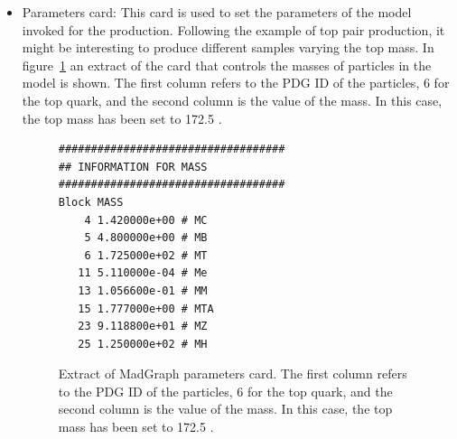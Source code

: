 \begin{itemize}
  \item Parameters card: This card is used to set the parameters of the model invoked for the production. Following the example of top pair production, it might be interesting to produce different samples varying the top mass. In figure~\ref{fig:ParamCard} an extract of the card that controls the masses of particles in the model is shown. The first column refers to the PDG ID of the particles, 6 for the top quark, and the second column is the value of the mass. In this case, the top mass has been set to 172.5 \GeVcc.
    \begin{figure}[!Hhtbp]
      \begin{center}
        \begin{minipage}[c]{0.45\textwidth}
\begin{verbatim}
###################################
## INFORMATION FOR MASS
###################################
Block MASS 
    4 1.420000e+00 # MC 
    5 4.800000e+00 # MB 
    6 1.725000e+02 # MT 
   11 5.110000e-04 # Me 
   13 1.056600e-01 # MM 
   15 1.777000e+00 # MTA 
   23 9.118800e+01 # MZ 
   25 1.250000e+02 # MH 
\end{verbatim}
        \end{minipage}
          \caption{Extract of MadGraph parameters card. The first column refers to the PDG ID of the particles, 6 for the top quark, and the second column is the value of the mass. In this case, the top mass has been set to 172.5 \GeVcc.}
          \label{fig:ParamCard}
      \end{center}
    \end{figure}


\end{itemize}
